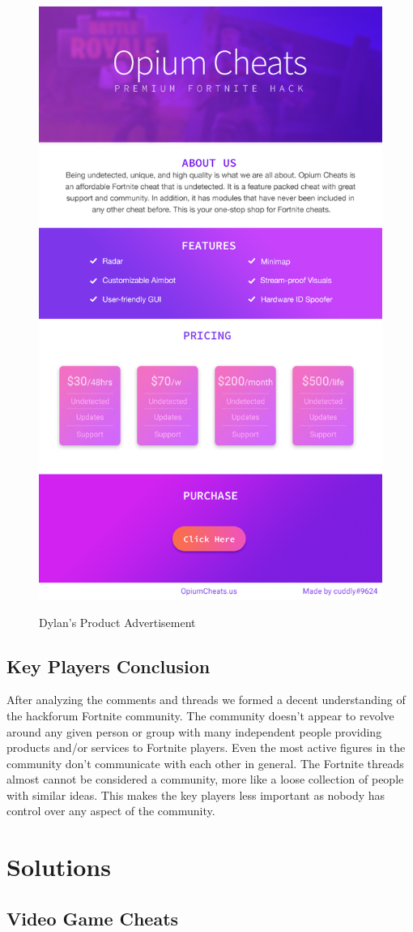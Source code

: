 \documentclass[sigconf]{acmart}
\begin{document}
\begin{figure}
	\centering
	\includegraphics[width = .5\linewidth]{DylanProduct.png}\cite{opium}
	\caption{Dylan's Product Advertisement}
\end{figure}

\subsection{Key Players Conclusion}
After analyzing the comments and threads we formed a decent understanding of the hackforum Fortnite community. The community doesn’t appear to revolve around any given person or group with many independent people providing products and/or services to Fortnite players. Even the most active figures in the community don’t communicate with each other in general. The Fortnite threads almost cannot be considered a community, more like a loose collection of people with similar ideas. This makes the key players less important as nobody has control over any aspect of the community.

\section{Solutions}
\subsection{Video Game Cheats}
\end{document}

